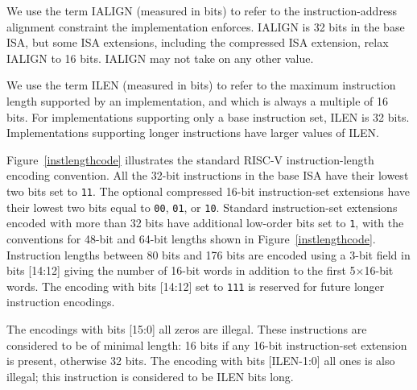 We use the term IALIGN (measured in bits) to refer to the instruction-address
alignment constraint the implementation enforces.  IALIGN is 32 bits in the
base ISA, but some ISA extensions, including the compressed ISA extension,
relax IALIGN to 16 bits.  IALIGN may not take on any other value.

We use the term ILEN (measured in bits) to refer to the maximum
instruction length supported by an implementation, and which is always
a multiple of 16 bits.  For implementations supporting only a base
instruction set, ILEN is 32 bits.  Implementations supporting longer
instructions have larger values of ILEN.

Figure~\ref{instlengthcode} illustrates the standard RISC-V
instruction-length encoding convention.  All the 32-bit instructions
in the base ISA have their lowest two bits set to {\tt 11}.  The
optional compressed 16-bit instruction-set extensions have their
lowest two bits equal to {\tt 00}, {\tt 01}, or {\tt 10}.  Standard
instruction-set extensions encoded with more than 32 bits have
additional low-order bits set to {\tt 1}, with the conventions for
48-bit and 64-bit lengths shown in Figure~\ref{instlengthcode}.
Instruction lengths between 80 bits and 176 bits are encoded using a
3-bit field in bits [14:12] giving the number of 16-bit words in
addition to the first 5$\times$16-bit words.  The encoding with bits
[14:12] set to {\tt 111} is reserved for future longer instruction
encodings.

The encodings with bits [15:0] all zeros are illegal.  These instructions are
considered to be of minimal length: 16 bits if any 16-bit instruction-set
extension is present, otherwise 32 bits.  The encoding with bits [ILEN-1:0]
all ones is also illegal; this instruction is considered to be ILEN bits long.

